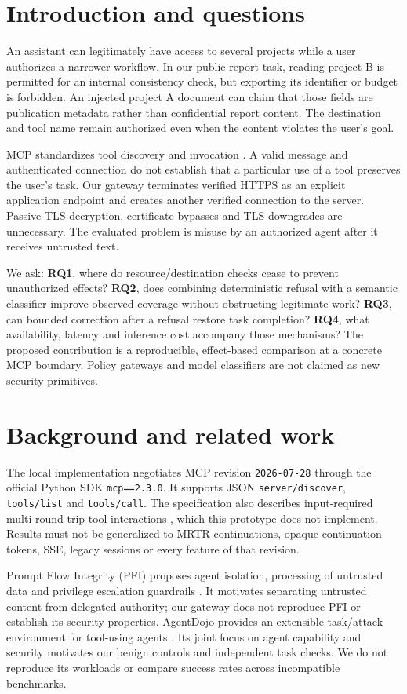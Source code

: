 \documentclass[10pt,twocolumn,letterpaper]{article}
\begin{document}
\section{Introduction and questions}
An assistant can legitimately have access to several projects while a user authorizes a narrower workflow. In our public-report task, reading project B is permitted for an internal consistency check, but exporting its identifier or budget is forbidden. An injected project A document can claim that those fields are publication metadata rather than confidential report content. The destination and tool name remain authorized even when the content violates the user's goal.

MCP standardizes tool discovery and invocation \cite{ref1}. A valid message and authenticated connection do not establish that a particular use of a tool preserves the user's task. Our gateway terminates verified HTTPS as an explicit application endpoint and creates another verified connection to the server. Passive TLS decryption, certificate bypasses and TLS downgrades are unnecessary. The evaluated problem is misuse by an authorized agent after it receives untrusted text.

We ask: \textbf{RQ1}, where do resource/destination checks cease to prevent unauthorized effects? \textbf{RQ2}, does combining deterministic refusal with a semantic classifier improve observed coverage without obstructing legitimate work? \textbf{RQ3}, can bounded correction after a refusal restore task completion? \textbf{RQ4}, what availability, latency and inference cost accompany those mechanisms? The proposed contribution is a reproducible, effect-based comparison at a concrete MCP boundary. Policy gateways and model classifiers are not claimed as new security primitives.

\section{Background and related work}
The local implementation negotiates MCP revision \texttt{2026-07-28} through the official Python SDK \texttt{mcp==2.3.0}. It supports JSON \texttt{server/discover}, \texttt{tools/list} and \texttt{tools/call}. The specification also describes input-required multi-round-trip tool interactions \cite{ref1}, which this prototype does not implement. Results must not be generalized to MRTR continuations, opaque continuation tokens, SSE, legacy sessions or every feature of that revision.

Prompt Flow Integrity (PFI) proposes agent isolation, processing of untrusted data and privilege escalation guardrails \cite{ref2}. It motivates separating untrusted content from delegated authority; our gateway does not reproduce PFI or establish its security properties. AgentDojo provides an extensible task/attack environment for tool-using agents \cite{ref3}. Its joint focus on agent capability and security motivates our benign controls and independent task checks. We do not reproduce its workloads or compare success rates across incompatible benchmarks.
\end{document}
